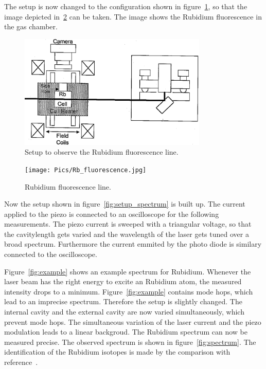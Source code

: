 The setup is now changed to the configuration shown in figure~\ref{fig:setup_fluorescence},
so that the image depicted in~\ref{fig:fluorescence} can be taken. The image
shows the Rubidium fluorescence in the gas chamber.

\begin{figure}
  \centering
  \includegraphics[width=0.8\textwidth]{Pics/setup_fluorescence.png}
  \caption{Setup to observe the Rubidium fluorescence line.\cite{anleitung}}
  \label{fig:setup_fluorescence}
\end{figure}

\begin{figure}
  \centering
  \texttt{[image: Pics/Rb\_fluorescence.jpg]}
  \caption{Rubidium fluorescence line.}
  \label{fig:fluorescence}
\end{figure}

\FloatBarrier
Now the setup shown in figure~\ref{fig:setup_spectrum} is built up.
The current applied to the piezo is connected to an oscilloscope
for the following measurements. The piezo current is sweeped with a triangular
voltage, so that the cavitylength
gets varied and the wavelength of the laser gets tuned over a broad spectrum.
Furthermore the current emmited by the photo diode is similary connected to the oscilloscope.

Figure~\ref{fig:example} shows an example spectrum for Rubidium. Whenever
the laser beam has the right energy to excite an Rubidium atom, the
measured intensity drops to a minimum. Figure~\ref{fig:example} contains
mode hops, which lead to an imprecise spectrum.
Therefore the setup is slightly changed. The internal cavity and the external cavity
are now varied simultaneously, which prevent mode hops.
The simultaneous variation of the laser current and the piezo modulation leads to a linear backgroud.
The Rubidium spectrum can now be measured precise. The observed spectrum
is shown in figure~\ref{fig:spectrum}. The identification of the Rubidium isotopes
is made by the comparison with reference~\cite{anleitung}.

